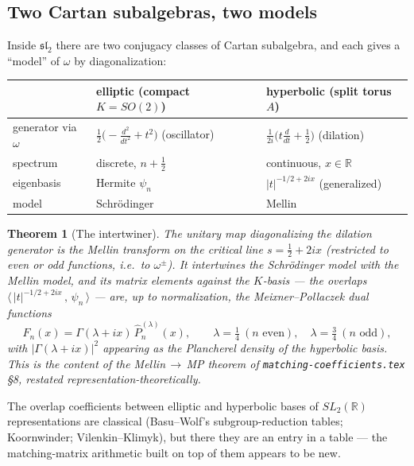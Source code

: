 \documentclass[11pt]{article}
\newtheorem{theorem}[proposition]{Theorem}
\theoremstyle{definition}
\theoremstyle{remark}
\newcommand{\R}{\mathbb{R}}
\newcommand{\G}{\Gamma}
\begin{document}
\subsection{Two Cartan subalgebras, two models}

Inside $\mathfrak{sl}_2$ there are two conjugacy classes of Cartan
subalgebra, and each gives a ``model'' of $\omega$ by
diagonalization:

\begin{center}
\begin{tabular}{lll}
\toprule
 & elliptic (compact $K = SO(2)$) & hyperbolic (split torus $A$) \\
\midrule
generator via $\omega$ &
$\tfrac12\bigl(-\tfrac{d^2}{dt^2} + t^2\bigr)$ (oscillator) &
$\tfrac{1}{2i}\bigl(t\tfrac{d}{dt} + \tfrac12\bigr)$ (dilation) \\
spectrum & discrete, $n + \tfrac12$ & continuous, $x \in \R$ \\
eigenbasis & Hermite $\psi_n$ & $|t|^{-1/2 + 2ix}$ (generalized) \\
model & Schr\"odinger & Mellin \\
\bottomrule
\end{tabular}
\end{center}

\begin{theorem}[The intertwiner]\label{thm:weil}
The unitary map diagonalizing the dilation generator is the Mellin
transform on the critical line $s = \tfrac12 + 2ix$ (restricted to
even or odd functions, i.e.\ to $\omega^\pm$). It intertwines the
Schr\"odinger model with the Mellin model, and its matrix elements
against the $K$-basis --- the overlaps
$\langle\, |t|^{-1/2+2ix} \,,\, \psi_n \,\rangle$ --- are, up to
normalization, the Meixner--Pollaczek dual functions
\[
  F_n(x) = \G(\lambda + ix)\,\widehat P_n^{(\lambda)}(x),
  \qquad \lambda = \tfrac14 \ (n \text{ even}), \quad
  \lambda = \tfrac34 \ (n \text{ odd}),
\]
with $|\G(\lambda+ix)|^2$ appearing as the Plancherel density of
the hyperbolic basis. This is the content of the
Mellin$\,\to\,$MP theorem of \texttt{matching-coefficients.tex}
\S8, restated representation-theoretically.
\end{theorem}

The overlap coefficients between elliptic and hyperbolic bases of
$SL_2(\R)$ representations are classical (Basu--Wolf's
subgroup-reduction tables; Koornwinder; Vilenkin--Klimyk), but
there they are an entry in a table --- the matching-matrix
arithmetic built on top of them appears to be new.
\end{document}

